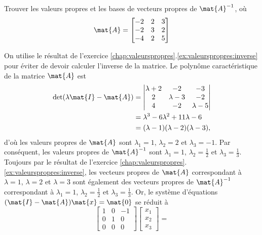 \begin{exercice}
  Trouver les valeurs propres et les bases de vecteurs propres de
  $\mat{A}^{-1}$, où
  \begin{displaymath}
    \mat{A} =
    \begin{bmatrix}
      -2 & 2 & 3 \\
      -2 & 3 & 2 \\
      -4 & 2 & 5
    \end{bmatrix}
  \end{displaymath}
  \begin{sol}
    On utilise le résultat de l'exercice
    \ref{chap:valeurspropres}.\ref{ex:valeurspropres:inverse} pour
    éviter de devoir calculer l'inverse de la matrice. Le polynôme
    caractéristique de la matrice $\mat{A}$ est
    \begin{align*}
      \det(\lambda \mat{I} - \mat{A})
      &= \begin{vmatrix}
        \lambda + 2 & -2 & -3 \\
        2 &  \lambda - 3 & -2 \\
        4 & -2 & \lambda - 5
      \end{vmatrix} \\
      &= \lambda^3 - 6 \lambda^2 + 11 \lambda - 6 \\
      &= (\lambda - 1)(\lambda - 2)(\lambda - 3),
    \end{align*}
    d'où les valeurs propres de $\mat{A}$ sont $\lambda_1 = 1$,
    $\lambda_2 = 2$ et $\lambda_3 = -1$. Par conséquent, les valeurs
    propres de $\mat{A}^{-1}$ sont $\lambda_1 = 1$, $\lambda_2 =
    \frac{1}{2}$ et $\lambda_3 = \frac{1}{3}$. Toujours par le
    résultat de l'exercice
    \ref{chap:valeurspropres}.\ref{ex:valeurspropres:inverse}, les
    vecteurs propres de $\mat{A}$ correspondant à $\lambda = 1$,
    $\lambda = 2$ et $\lambda = 3$ sont également des vecteurs propres
    de $\mat{A}^{-1}$ correspondant à $\lambda_1 = 1$, $\lambda_2 =
    \frac{1}{2}$ et $\lambda_3 = \frac{1}{3}$. Or, le système
    d'équations $(\mat{I} - \mat{A}) \mat{x} = \mat{0}$ se réduit à
    \begin{displaymath}
      \begin{bmatrix}
        1 & 0 & -1 \\
        0 & 1 &  0 \\
        0 & 0 &  0
      \end{bmatrix}
      \begin{bmatrix} x_1 \\ x_2 \\ x_3 \end{bmatrix} =

\end{displaymath}
\end{sol}
\end{exercice}
